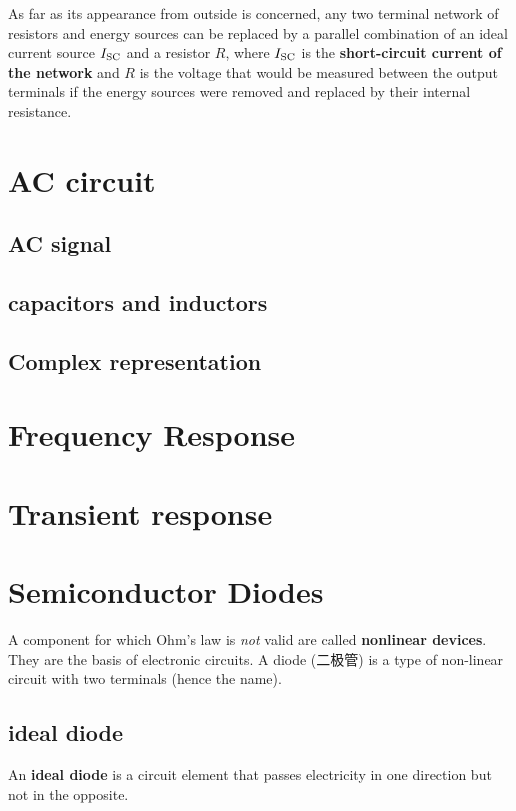 \documentclass[a4paper,UTF8]{article}
\theoremstyle{mystyle}{
  \newtheorem{law}{Law}
}
\begin{document}
\begin{theorem}
As far as its appearance from outside is concerned, any two terminal
network of resistors and energy sources can be replaced by a parallel
combination of an ideal current source $I_{\rm SC}$ and a resistor $R$, where 
$I_{\rm SC}$ is the
\textbf{short-circuit current of the network} and $R$ is the voltage that would be
measured between the output terminals if the energy sources were
removed and replaced by their internal resistance.
\end{theorem}

\section{AC circuit}
\subsection{AC signal}
\subsection{capacitors and inductors}

\subsection{Complex representation}

\section{Frequency Response}

\section{Transient response}

\section{Semiconductor Diodes}
A component for which Ohm's law is \emph{not} valid are
called \textbf{nonlinear devices}. They are the basis of
electronic circuits. A diode (二极管) is a type of non-linear 
circuit with two
terminals (hence the name).

\subsection{ideal diode}
An \textbf{ideal diode} is a circuit element that passes
electricity in one direction but not in the opposite.
\end{document}

